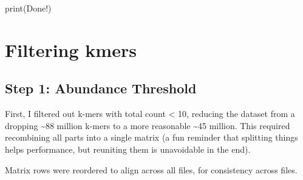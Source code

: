 \documentclass[
]{book}
\newenvironment{Shaded}{\begin{snugshade}}{\end{snugshade}}
\newcommand{\FunctionTok}[1]{\textcolor[rgb]{0.00,0.00,0.00}{#1}}
\newcommand{\NormalTok}[1]{#1}
\newcommand{\StringTok}[1]{\textcolor[rgb]{0.31,0.60,0.02}{#1}}
\begin{document}
\begin{Shaded}
\begin{Highlighting}[]
\FunctionTok{print}\NormalTok{(}\StringTok{\textquotesingle{}Done!\textquotesingle{}}\NormalTok{)}
\end{Highlighting}
\end{Shaded}

\hypertarget{filtering-kmers}{%
\section{Filtering kmers}\label{filtering-kmers}}

\hypertarget{step-1-abundance-threshold}{%
\subsection{Step 1: Abundance Threshold}\label{step-1-abundance-threshold}}

First, I filtered out k-mers with total count \textless{} 10, reducing the dataset from a dropping \textasciitilde88 million k-mers to a more reasonable \textasciitilde45 million. This required recombining all parts into a single matrix (a fun reminder that splitting things helps performance, but reuniting them is unavoidable in the end).

Matrix rows were reordered to align across all files, for consistency across files.
\end{document}
